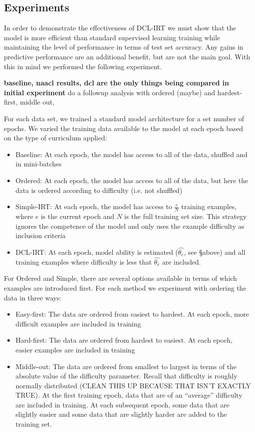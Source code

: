 \documentclass[letterpaper]{article} %
\begin{document}
\subsection{Experiments} 

In order to demonstrate the effectiveness of DCL-IRT we must show that the model is more efficient than standard supervised learning training while maintaining the level of performance in terms of test set accuracy. 
Any gains in predictive performance are an additional benefit, but are not the main goal.
With this in mind we performed the following experiment.

\textbf{baseline, naacl results, dcl are the only things being compared in initial experiment}
do a followup analysis with ordered (maybe) and hardest-first, middle out, 

For each data set, we trained a standard model architecture for a set number of epochs. 
We varied the training data available to the model at each epoch based on the type of curriculum applied:

\begin{itemize}
	\item 
	Baseline: At each epoch, the model has access to all of the data, shuffled and in mini-batches
	\item 
	Ordered: At each epoch, the model has access to all of the data, but here the data is ordered according to difficulty (i.e. not shuffled) 
	\item 
	Simple-IRT: At each epoch, the model has access to $\frac{e}{N}$ training examples, where $e$ is the current epoch and $N$ is the full training set size. 
	This strategy ignores the competence of the model and only uses the example difficulty as inclusion criteria
	\item 
	DCL-IRT: At each epoch, model ability is estimated ($\hat{\theta_e}$, see \S above) and all training examples where difficulty is less that $\hat{\theta_e}$ are included.
\end{itemize}

For Ordered and Simple, there are several options available in terms of which examples are introduced first.
For each method we experiment with ordering the data in three ways:
\begin{itemize}
	\item 
	Easy-first: The data are ordered from easiest to hardest. At each epoch, more difficult examples are included in training
	\item 
	Hard-first: The data are ordered from hardest to easiest. At each epoch, easier examples are included in training
	\item 
	Middle-out: The data are ordered from smallest to largest in terms of the absolute value of the difficulty parameter. Recall that difficulty is roughly normally distributed (CLEAN THIS UP BECAUSE THAT ISN'T EXACTLY TRUE). At the first training epoch, data that are of an ``average'' difficulty are included in training. At each subsequent epoch, some data that are slightly easier and some data that are slightly harder are added to the training set.
\end{itemize}
\end{document}
